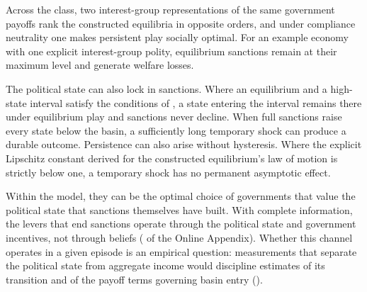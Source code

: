  Across the class, two interest-group representations
of the same government payoffs rank the constructed equilibria in opposite orders, and
under compliance neutrality one makes persistent play socially optimal. For an example
economy with one explicit interest-group polity, equilibrium sanctions remain at their
maximum level and generate welfare losses.

The political state can also lock in sanctions. Where an equilibrium and a high-state
interval satisfy the conditions of , a state entering the interval
remains there under equilibrium play and sanctions never decline. When full sanctions
raise every state below the basin, a sufficiently long temporary shock can produce a
durable outcome. Persistence can also arise without hysteresis. Where the explicit
Lipschitz constant derived for the constructed equilibrium's law of motion is strictly
below one, a temporary shock has no permanent asymptotic effect.

 Within the model, they can be the optimal choice of governments that
value the political state that sanctions themselves have built. With complete
information, the levers that end sanctions operate through the political state and
government incentives, not through beliefs ( of the
Online Appendix). Whether this channel operates in a given episode is an empirical
question: measurements that separate the political state from aggregate income would
discipline estimates of its transition and of the payoff terms governing basin entry
(). 
